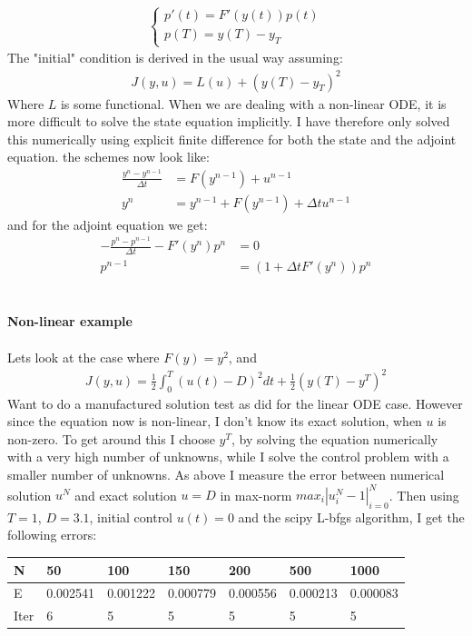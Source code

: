 \documentclass[11pt,a4paper]{report}
\begin{document}
\begin{align*}
\left\{
     \begin{array}{lr}
       	p'(t)=F'(y(t))p(t)\\
       	   p(T)= y(T)-y_T
     \end{array}
   \right.
\end{align*}
The "initial" condition is derived in the usual way assuming: 
\begin{align*}
J(y,u)=L(u) + (y(T)-y_T)^2
\end{align*}
Where $L$ is some functional. When we are dealing with a non-linear ODE, it is more difficult to solve the state equation implicitly. I have therefore only solved this numerically using explicit finite difference for both the state and the adjoint equation. the schemes now look like: 
  \begin{align*}
\frac{y^n-y^{n-1}}{\Delta t} &= F(y^{n-1}) + u^{n-1}\\
y^{n} &= y^{n-1} +F(y^{n-1})+\Delta t u^{n-1} 
\end{align*} 
and for the adjoint equation we get:
\begin{align*}
-\frac{p^n-p^{n-1}}{\Delta t} -F'(y^{n})p^n &=0 \\
p^{n-1} &= (1+\Delta t F'(y^{n}))p^n
\end{align*} 
\\
\\
\textbf{Non-linear example}
\\
\\
Lets look at the case where $F(y) = y^2$, and \begin{align*}
J(y,u) = \frac{1}{2}\int_0^T(u(t)-D)^2dt + \frac{1}{2}(y(T)-y^T)^2
\end{align*}
Want to do a manufactured solution test as did for the  linear ODE case. However since the equation now is non-linear, I don't know its exact solution, when $u$ is non-zero. To get around this I choose $y^T$, by solving the equation numerically with a very high number of unknowns, while I solve the control problem with a smaller number of unknowns. As above I measure the error between numerical solution $u^N$ and exact solution $u=D$ in max-norm $max_i{|u^N_i-1|}_{i=0}^N$. Then using $T=1$, $D=3.1$, initial control $u(t)=0$ and the scipy L-bfgs algorithm, I get the following errors:
\begin{center}
    \begin{tabular}{| l | l | l | l | l | l | l |}
    \hline
    N & 50 & 100  & 150 & 200 & 500 & 1000 \\ \hline
    E & 0.002541 & 0.001222 &0.000779 & 0.000556 & 0.000213 & 0.000083	\\ \hline
    Iter & 6 & 5  & 5 & 5 & 5 & 5 \\ \hline
    \end{tabular}
\end{center}
\end{document}
